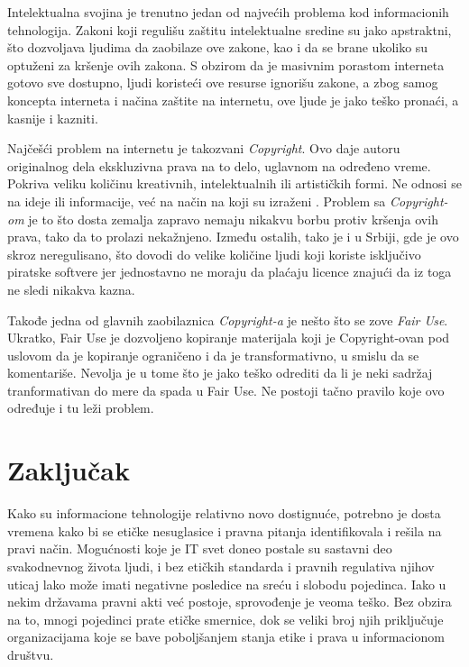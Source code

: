 \documentclass[a4paper]{article}
\begin{document}
{Intelektualna svojina je trenutno jedan od najvećih problema kod informacionih tehnologija. Zakoni koji regulišu zaštitu intelektualne sredine su jako apstraktni, što dozvoljava ljudima da zaobilaze ove zakone, kao i da se brane ukoliko su optuženi za kršenje ovih zakona. S obzirom da je masivnim porastom interneta gotovo sve dostupno, ljudi koristeći ove resurse ignorišu zakone, a zbog samog koncepta interneta i načina zaštite na internetu, ove ljude je jako teško pronaći, a kasnije i kazniti.

Najčešći problem na internetu je takozvani \emph{Copyright}. Ovo daje autoru originalnog dela ekskluzivna prava na to delo, uglavnom na određeno vreme. Pokriva veliku količinu kreativnih, intelektualnih ili artističkih formi. Ne odnosi se na ideje ili informacije, već na način na koji su izraženi \cite{Copyright}. Problem sa \emph{Copyright-om} je to što dosta zemalja zapravo nemaju nikakvu borbu protiv kršenja ovih prava, tako da to prolazi ne\-ka\-žnje\-no. Između ostalih, tako je i u Srbiji, gde je ovo skroz neregulisano, što dovodi do velike količine ljudi koji koriste isključivo piratske softvere jer jednostavno ne moraju da plaćaju licence znajući da iz toga ne sledi nikakva kazna.

Takođe jedna od glavnih zaobilaznica \emph{Copyright-a} je nešto što se zove \emph{Fair Use}. Ukratko, Fair Use je dozvoljeno kopiranje materijala koji je Copyright-ovan pod uslovom da je kopiranje ograničeno i da je transformativno, u smislu da se komentariše. Nevolja je u tome što je jako teško odrediti da li je neki sadržaj tranformativan do mere da spada u Fair Use. Ne postoji tačno pravilo koje ovo određuje i tu leži problem.

\section{Zaključak}
Kako su informacione tehnologije relativno novo dostignuće, potrebno je dosta vremena kako bi se etičke nesuglasice i pravna pitanja identifikovala i rešila na pravi način. Mogućnosti koje je IT svet doneo postale su sastavni deo svakodnevnog života ljudi, i bez etičkih standarda i pravnih regulativa njihov uticaj lako može imati negativne posledice na sreću i slobodu pojedinca.
Iako u nekim državama pravni akti već postoje, sprovođenje je veoma teško. Bez obzira na to, mnogi pojedinci prate etičke smernice, dok se veliki broj njih priključuje organizacijama koje se bave poboljšanjem stanja etike i prava u informacionom društvu.

}
\end{document}
